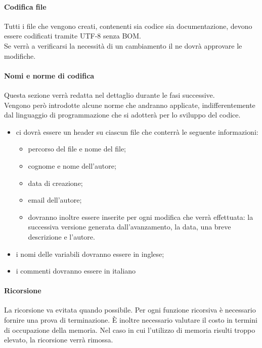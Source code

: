 			\paragraph{Codifica file} %
			\label{par:codifica}
			Tutti i file che vengono creati, contenenti sia codice sia documentazione, devono essere codificati tramite UTF\gloss{}-8 senza BOM\gloss{}. \\
			Se verrà a verificarsi la necessità di un cambiamento il \roleProjectManager{} ne dovrà approvare le modifiche.
			
			\paragraph{Nomi e norme di codifica} %
			\label{par:nomi_e_norme_di_codifica}
			Questa sezione verrà redatta nel dettaglio durante le fasi successive. \\
			Vengono però introdotte alcune norme che andranno applicate, indifferentemente dal linguaggio di programmazione che si adotterà per lo sviluppo del codice. \\
				\begin{itemize}
					\item ci dovrà essere un header su ciascun file che conterrà le seguente informazioni:
						\begin{itemize}
							\item percorso del file e nome del file;
							\item cognome e nome dell'autore;
							\item data di creazione;
							\item email dell'autore;
							\item dovranno inoltre essere inserite per ogni modifica che verrà effettuata: la successiva versione generata dall'avanzamento, la data, una breve descrizione e l'autore.
						\end{itemize}
					\item i nomi delle variabili dovranno essere in inglese;
					\item i commenti dovranno essere in italiano
				\end{itemize}
			
			\paragraph{Ricorsione} %
			\label{par:ricorsione}
			La ricorsione va evitata quando possibile. Per ogni funzione ricorsiva è necessario fornire una prova di terminazione. È inoltre necessario valutare il costo in termini di occupazione della memoria. Nel caso in cui l’utilizzo di memoria risulti troppo elevato, la ricorsione verrà rimossa.
		
